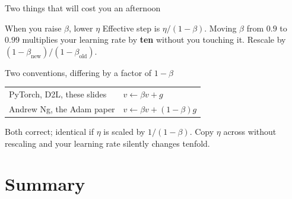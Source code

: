 \documentclass[aspectratio=169]{beamer}
\begin{document}
\begin{frame}[shrink=6]{Two things that will cost you an afternoon}
  \begin{alertblock}{When you raise $\beta$, lower $\eta$}
    Effective step is $\eta/(1-\beta)$. Moving $\beta$ from $0.9$ to $0.99$
    multiplies your learning rate by \textbf{ten} without you touching it.
    Rescale by $(1-\beta_{\text{new}})/(1-\beta_{\text{old}})$.
  \end{alertblock}
  \vspace{0.3em}
  \begin{alertblock}{Two conventions, differing by a factor of $1-\beta$}
    \begin{center}\small
    \begin{tabular}{@{}ll@{}}
      \toprule
      PyTorch, D2L, these slides & $v \leftarrow \beta v + g$\\
      Andrew Ng, the Adam paper  & $v \leftarrow \beta v + (1-\beta) g$\\
      \bottomrule
    \end{tabular}
    \end{center}
    \vspace{0.2em}
    Both correct; identical if $\eta$ is scaled by $1/(1-\beta)$. Copy $\eta$
    across without rescaling and your learning rate silently changes tenfold.
  \end{alertblock}
\end{frame}

\section{Summary}
\label{sec:summary}
\end{document}
